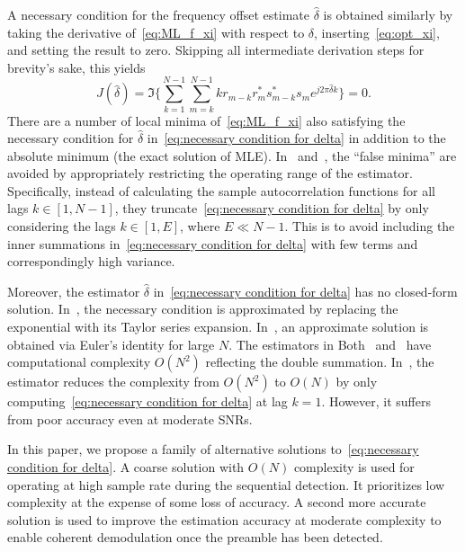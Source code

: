 A necessary condition for the frequency offset estimate $\hat{\delta}$
is obtained similarly by taking the derivative of~\eqref{eq:ML_f_xi} with respect to
$\delta$, inserting~\eqref{eq:opt_xi}, and setting the result to
zero.
Skipping all intermediate derivation steps for brevity's sake, this yields
\begin{equation}
  \label{eq:necessary condition for delta}
  J(\hat{\delta}) = \Im\bigg\{\sum_{k=1}^{N-1}{\sum_{m=k}^{N-1}{kr_{m-k}r_m^{*}s_{m-k}^{*}s_m}e^{j2\pi\hat{\delta}k}}\bigg\}=0.
\end{equation}
There are a number of local minima of~\eqref{eq:ML_f_xi} also satisfying
the necessary condition for $\hat{\delta}$ in~\eqref{eq:necessary condition for delta}
in addition to the absolute minimum (the exact solution of MLE).
In~\cite{Luise_Reggiannini_95} and~\cite{Fitz_94}, the ``false minima'' are avoided
by appropriately restricting the operating range of the estimator.
Specifically,
instead of calculating the sample autocorrelation functions for all
lags $k\in[1,N-1]$, 
they truncate~\eqref{eq:necessary condition for delta} by only considering the lags $k{\in}[1,E]$,
where $E \ll N{-}1$.
This is to avoid 
including the inner summations in~\eqref{eq:necessary condition for delta} with few
terms and correspondingly high variance.

Moreover, the estimator $\hat{\delta}$ in~\eqref{eq:necessary condition for delta} has no closed-form solution.
In~\cite{Luise_Reggiannini_95}, the necessary condition is
approximated by replacing the exponential with its Taylor series
expansion. 
In~\cite{Fitz_94}, an approximate solution is obtained via Euler's identity for large $N$.
The estimators in Both~\cite{Luise_Reggiannini_95} and~\cite{Fitz_94}  have computational complexity $O(N^2)$ 
reflecting the double summation.
In~\cite{kay_89}, the  estimator reduces the complexity from $O(N^2)$
to $O(N)$ by only
computing~\eqref{eq:necessary condition for delta} at lag $k=1$.
However, it suffers from poor accuracy even at moderate SNRs.

In this paper, we propose a family of alternative solutions to~\eqref{eq:necessary condition for delta}.
A coarse solution with $O(N)$ complexity is used for operating at high sample rate during the sequential detection.
It prioritizes low complexity at the expense of some loss of
accuracy.
A second more accurate solution is used to improve
the estimation accuracy at moderate complexity to enable coherent demodulation once the preamble has been detected. 

